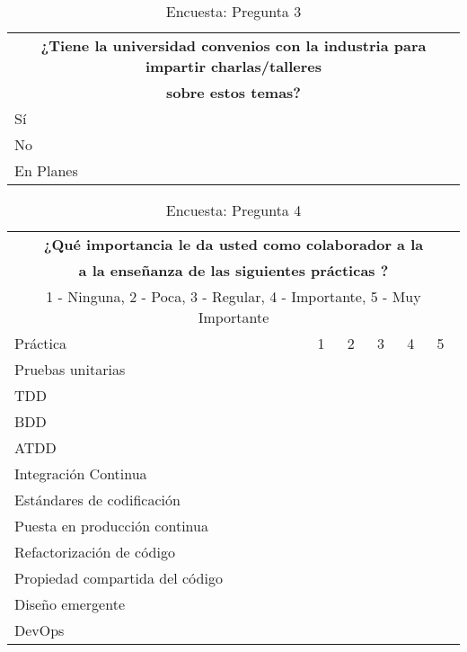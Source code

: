 \begin{table}[h!]
\begin{tabular}{ |p{14cm}||p{1cm}|}
 \toprule[1.5pt]
 \multicolumn{2}{|c|}{\textbf{¿Tiene la universidad convenios con la industria para impartir charlas/talleres}} \\
  \multicolumn{2}{|c|}{\textbf{sobre estos temas?}} \\
\toprule[1.5pt]
    Sí & \\
    \hline
    No & \\
    \hline
    En Planes & \\
 \hline
\end{tabular}
    \caption{Encuesta: Pregunta 3}
\end{table}

\begin{table}[h!]
\begin{tabular}{ |p{7cm}||p{1cm}|p{1cm}|p{1cm}|p{1cm}|p{1cm}|  }
 \toprule[1.5pt]
 \multicolumn{6}{|c|}{\textbf{¿Qué importancia le da usted como colaborador a la }} \\
  \multicolumn{6}{|c|}{\textbf{a la enseñanza de las siguientes prácticas ?}} \\
  \multicolumn{6}{|c|}{1 - Ninguna, 2 - Poca, 3 - Regular, 4 - Importante, 5 - Muy Importante} \\
\toprule[1.5pt]
Práctica & 1 & 2 & 3 & 4 & 5 \\
\toprule[1.5pt]
    Pruebas unitarias & & & & &\\
    \hline
    TDD & & & & & \\
    \hline
    BDD & & & & & \\
    \hline
    ATDD & & & & & \\
    \hline
    Integración Continua & & & & & \\
    \hline
    Estándares de codificación & & & & & \\
    \hline
    Puesta en producción continua & & & & & \\
    \hline
    Refactorización de código & & & & & \\
    \hline
    Propiedad compartida del código & & & & & \\
    \hline
    Diseño emergente & & & & & \\
    \hline
    DevOps & & & & & \\
 \hline
\end{tabular}
    \caption{Encuesta: Pregunta 4}
\end{table}


